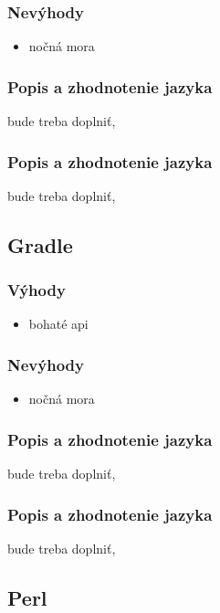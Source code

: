 \subsubsection{Nevýhody}
\begin{itemize}
	\item nočná mora
	\newline
\end{itemize}

\subsubsection{Popis a zhodnotenie jazyka}
bude treba doplniť,

\subsubsection{Popis a zhodnotenie jazyka}
bude treba doplniť,

\subsection{Gradle}
\subsubsection{Výhody}
\begin{itemize}
	\item bohaté api
	\newline
\end{itemize}
\subsubsection{Nevýhody}
\begin{itemize}
	\item nočná mora
	\newline
\end{itemize}

\subsubsection{Popis a zhodnotenie jazyka}
bude treba doplniť,

\subsubsection{Popis a zhodnotenie jazyka}
bude treba doplniť,

\subsection{Perl}
